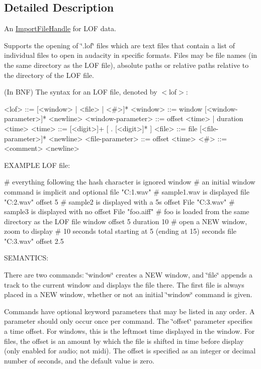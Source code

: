 \subsection{Detailed Description}
An \hyperlink{class_import_file_handle}{Import\+File\+Handle} for L\+OF data. 

Supports the opening of \char`\"{}.\+lof\char`\"{} files which are text files that contain a list of individual files to open in audacity in specific formats. Files may be file names (in the same directory as the L\+OF file), absolute paths or relative paths relative to the directory of the L\+OF file.

(In B\+NF) The syntax for an L\+OF file, denoted by $<$lof$>$\+:

\begin{DoxyVerb}  <lof> ::= [<window> | <file> | <#>]*
  <window> ::= window [<window-parameter>]* <newline>
  <window-parameter> ::= offset <time> | duration <time>
  <time> ::= [<digit>]+ [ . [<digit>]* ]
  <file> ::= file [<file-parameter>]* <newline>
  <file-parameter> ::= offset <time>
  <#> ::= <comment> <newline>
\end{DoxyVerb}


E\+X\+A\+M\+P\+LE L\+OF file\+:

\begin{DoxyVerb}  # everything following the hash character is ignored
  window # an initial window command is implicit and optional
  file "C:\sample1.wav"    # sample1.wav is displayed
  file "C:\sample2.wav" offset 5   # sample2 is displayed with a 5s offset
  File "C:\sample3.wav"            # sample3 is displayed with no offset
  File "foo.aiff" # foo is loaded from the same directory as the LOF file
  window offset 5 duration 10      # open a NEW window, zoom to display
  # 10 seconds total starting at 5 (ending at 15) seconds
  file "C:\sample3.wav" offset 2.5
\end{DoxyVerb}


S\+E\+M\+A\+N\+T\+I\+CS\+:

There are two commands\+: \char`\"{}window\char`\"{} creates a N\+EW window, and \char`\"{}file\char`\"{} appends a track to the current window and displays the file there. The first file is always placed in a N\+EW window, whether or not an initial \char`\"{}window\char`\"{} command is given.

Commands have optional keyword parameters that may be listed in any order. A parameter should only occur once per command. The \char`\"{}offset\char`\"{} parameter specifies a time offset. For windows, this is the leftmost time displayed in the window. For files, the offset is an amount by which the file is shifted in time before display (only enabled for audio; not midi). The offset is specified as an integer or decimal number of seconds, and the default value is zero.


